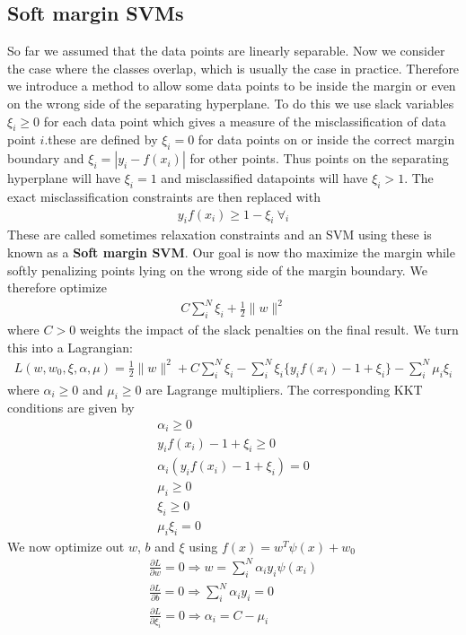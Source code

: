 \documentclass[main]{subfiles}
\begin{document}
\subsection{Soft margin SVMs}
So far we assumed that the data points are linearly separable. Now we consider the case where the classes overlap, which is usually the case in practice. Therefore we introduce a method to allow some data points to be inside the margin or even on the wrong side of the separating hyperplane. To do this we use slack variables $\xi_i \geq 0$ for each data point which gives a measure of the misclassification of data point $i$.these are defined by $\xi_i = 0$ for data points on or inside the correct margin boundary and $\xi_i=|y_i - f(x_i)|$ for other points. Thus points on the separating hyperplane will have $\xi_i=1$ and misclassified datapoints will have $\xi_i > 1$. The exact misclassification constraints are then replaced with 
\begin{align}
y_i f(x_i) \geq 1 - \xi_i \ \forall_i
\end{align}
These are called sometimes relaxation constraints and an SVM using these is known as a \textbf{Soft margin SVM}. Our goal is now tho maximize the margin while softly penalizing points lying on the wrong side of the margin boundary. We therefore optimize
\begin{align}
C \sum_i^N \xi_i + \frac{1}{2} \parallel w \parallel^2
\end{align}
where $C>0$ weights the impact of the slack penalties on the final result.
We turn this into a Lagrangian:
\begin{align}
L(w,w_0,\xi,\alpha,\mu)=\frac{1}{2}\parallel w \parallel^2+C \sum_i^N \xi_i-\sum_i^N \xi_i \{y_i f(x_i)-1 + \xi_i\}-\sum_i^N \mu_i \xi_i
\end{align}
where $\alpha_i \geq 0$ and $\mu_i \geq 0$ are Lagrange multipliers. The corresponding KKT conditions are given by
\begin{align}
\alpha_i \geq 0 \\
y_i f(x_i)-1+\xi_i \geq 0 \\
\alpha_i(y_i f(x_i)-1+\xi_i) = 0 \\
\mu_i \geq 0 \\
\xi_i \geq 0 \\
\mu_i \xi_i = 0
\end{align}
We now optimize out $w$, $b$ and $\xi$ using $f(x)=w^T\psi(x)+w_0$
\begin{align}
\frac{\partial L}{\partial w}=0 \Rightarrow w=\sum_i^N\alpha_i y_i\psi(x_i) \\
\frac{\partial L}{\partial b}=0 \Rightarrow \sum_i^N\alpha_i y_i = 0 \\
\frac{\partial L}{\partial \xi_i}=0 \Rightarrow \alpha_i=C-\mu_i
\end{align}
\end{document}
